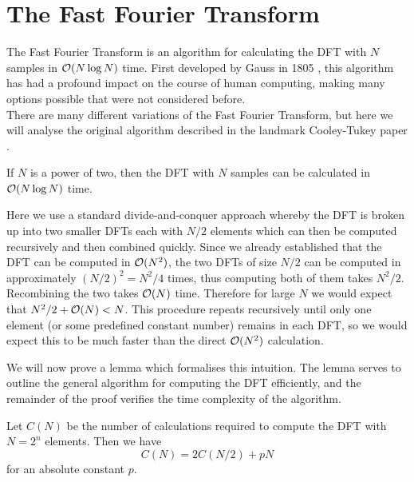 \section{The Fast Fourier Transform}

The Fast Fourier Transform is an algorithm for calculating the DFT with $N$ samples in $\mathcal O(N \log N)$ time. First developed by Gauss in 1805 \cite{gauss}, this algorithm has had a profound impact on the course of human computing, making many options possible that were not considered before.\\
There are many different variations of the Fast Fourier Transform, but here we will analyse the original algorithm described in the landmark Cooley-Tukey paper \cite{10.2307/2003354}.

\begin{theorem}\label{thm:fft}
    If $N$ is a power of two, then the DFT with $N$ samples can be calculated in $\mathcal O(N\log N)$ time.
\end{theorem}

Here we use a standard divide-and-conquer approach whereby the DFT is broken up into two smaller DFTs each with $N/2$ elements which can then be computed recursively and then combined quickly. Since we already established that the DFT can be computed in $\mathcal O(N^2)$, the two DFTs of size $N/2$ can be computed in approximately $(N/2)^2 = N^2/4$ times, thus computing both of them takes $N^2 / 2$. Recombining the two takes $\mathcal O(N)$ time. Therefore for large $N$ we would expect that $N^2/2 + \mathcal O(N) < N$. This procedure repeats recursively until only one element (or some predefined constant number) remains in each DFT, so we would expect this to be much faster than the direct $\mathcal O(N^2)$ calculation.

We will now prove a lemma which formalises this intuition. The lemma serves to outline the general algorithm for computing the DFT efficiently, and the remainder of the proof verifies the time complexity of the algorithm.

\begin{lemma}
    Let $C(N)$ be the number of calculations required to compute the DFT with $N = 2^n$ elements. Then we have
    \begin{equation}
        C(N) = 2 C(N/2) + pN \label{eq:fftlem}
    \end{equation}
    for an absolute constant $p$.
\end{lemma}

